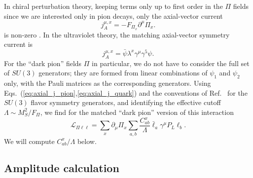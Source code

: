 In chiral perturbation theory, keeping terms only up to first order in the $\Pi$ fields since we are interested only in pion decays, only the axial-vector current 
%
\begin{equation} \label{eq:axial_j_pion}
j_A^{\mu,x} = -F_{\Pi_x} \partial^\mu \Pi_x.
\end{equation}
is non-zero \cite{Scherer:2005ri}. In the ultraviolet theory, the matching axial-vector symmetry current is
\begin{equation} \label{eq:axial_j_quark}
j_A^{\mu,x} = \bar{\psi} \lambda^x \gamma^\mu \gamma^5 \psi.
\end{equation}
For the ``dark pion'' fields $\Pi$ in particular, we do not have to consider the full set of $SU(3)$ generators; they are formed from linear combinations of $\psi_1$ and $\psi_2$ only, with the Pauli matrices as the corresponding generators. Using Eqs.~(\ref{eq:axial_j_pion},\ref{eq:axial_j_quark}) and the conventions of Ref.~\cite{Scherer:2005ri} for the $SU(3)$ flavor symmetry generators, and identifying the effective cutoff $\Lambda \sim M_S^2/F_\Pi$, we find for the matched ``dark pion'' version of this interaction
\begin{equation}
    \mathcal{L}_{\Pi\ell\ell} = \sum_{x} \partial_\mu \Pi_x\sum_{a,b}\frac{C_{ab}^x}{\Lambda}\bar{\ell}_a\gamma^\mu P_L\ell_b.
\end{equation}
We will compute $C_{ab}^x/\Lambda$ below.
%

\subsection{Amplitude calculation}


